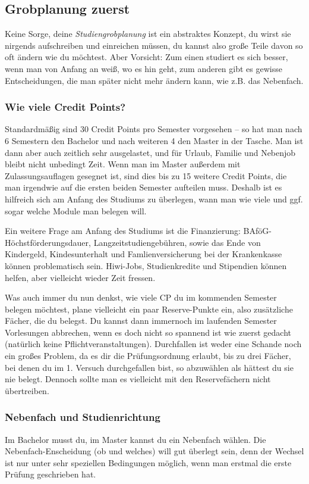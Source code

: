 
\subsection{Grobplanung zuerst}
\label{grob}
	Keine Sorge, deine \textit{Studiengrobplanung} ist ein abstraktes Konzept, du wirst sie nirgends aufschreiben und einreichen müssen, du kannst also große Teile davon so oft ändern wie du möchtest. Aber Vorsicht: Zum einen studiert es sich besser, wenn man von Anfang an weiß, wo es hin geht, zum anderen gibt es gewisse Entscheidungen, die man später nicht mehr ändern kann, wie z.B. das Nebenfach.

\subsubsection{Wie viele Credit Points?}
	Standardmäßig sind 30 Credit Points pro Semester vorgesehen -- so hat man nach 6 Semestern den Bachelor und nach weiteren 4 den Master in der Tasche. Man ist dann aber auch zeitlich sehr ausgelastet, und für Urlaub, Familie und Nebenjob bleibt nicht unbedingt Zeit. Wenn man im Master außerdem mit Zulassungsauflagen gesegnet ist, sind dies bis zu 15 weitere Credit Points, die man irgendwie auf die ersten beiden Semester aufteilen muss. Deshalb ist es hilfreich sich am Anfang des Studiums zu überlegen, wann man wie viele und ggf. sogar welche Module man belegen will.

	Ein weitere Frage am Anfang des Studiums ist die Finanzierung:
	BAföG-Höchstförderungsdauer, Langzeitstudiengebühren, sowie das
	Ende von Kindergeld, Kindesunterhalt und Famlienversicherung bei
	der Krankenkasse können problematisch sein. Hiwi-Jobs,
	Studienkredite und Stipendien können helfen, aber vielleicht
	wieder Zeit fressen. 

	Was auch immer du nun denkst, wie viele CP du im kommenden Semester belegen möchtest, plane vielleicht ein paar Reserve-Punkte ein, also zusätzliche Fächer, die du belegst. Du kannst dann immernoch im laufenden Semester Vorlesungen abbrechen, wenn es doch nicht so spannend ist wie zuerst gedacht (natürlich keine Pflichtveranstaltungen). Durchfallen ist weder eine Schande noch ein großes Problem, da es dir die Prüfungsordnung erlaubt, bis zu drei Fächer, bei denen du im 1. Versuch durchgefallen bist, so abzuwählen als hättest du sie nie belegt. Dennoch sollte man es vielleicht mit den Reservefächern nicht übertreiben.

\subsubsection{Nebenfach und Studienrichtung}
\label{nebenfach}
	Im Bachelor musst du, im Master kannst du ein Nebenfach wählen. Die Nebenfach-Enscheidung (ob und welches) will gut überlegt sein, denn der Wechsel ist nur unter sehr speziellen Bedingungen möglich, wenn man erstmal die erste Prüfung geschrieben hat.
 
